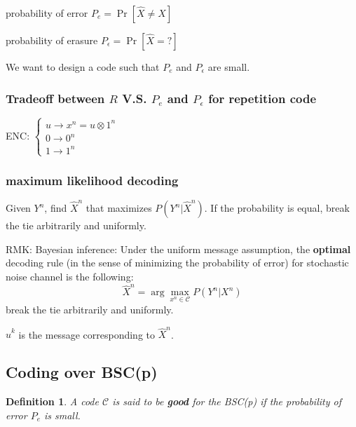 \documentclass[letterpaper,12pt]{article}
\newtheorem{definition}{Definition}
\begin{document}
probability of error $P_e = \Pr[\hat{X}\neq X]$

probability of erasure $P_{\epsilon} = \Pr[\hat{X}=?]$

We want to design a code such that $P_e$ and $P_{\epsilon}$ are small.

\subsubsection{Tradeoff between $R$ V.S. $P_e$ and $P_{\epsilon}$ for repetition code}
ENC: $\begin{cases}
    u \to x^n = u\otimes 1^n \\
    0 \to 0^n \\
    1 \to 1^n
\end{cases}$

\subsubsection{maximum likelihood decoding}
Given $Y^n$, find $\hat{X}^n$ that maximizes $P(Y^n|\hat{X}^n)$. If the probability is equal, break the tie arbitrarily and uniformly.

RMK: Bayesian inference: Under the uniform message assumption, the \textbf{optimal} decoding rule (in the sense of minimizing the probability of error) for stochastic noise channel is the following: \[
    \hat{X}^n = \arg\max_{x^n\in\mathcal{C}}P(Y^n|X^n)
\]
break the tie arbitrarily and uniformly.

$\hat{u}^k$ is the message corresponding to $\hat{X}^n$.
\subsection{Coding over BSC(p)}
\begin{definition}
    A code $\mathcal{C}$ is said to be \textbf{good} for the BSC(p) if the probability of error $P_e$ is small.
\end{definition}
\end{document}
